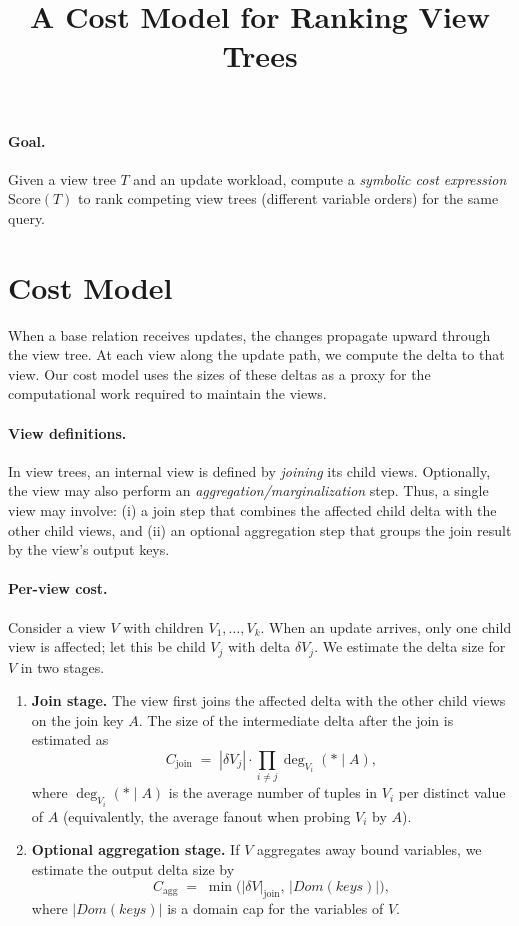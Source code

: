 \documentclass[11pt]{article}
\title{A Cost Model for Ranking View Trees}
\author{}
\date{}
\renewcommand{\deg}{\operatorname{deg}}
\begin{document}
\maketitle

\paragraph{Goal.}
Given a view tree $T$ and an update workload, compute a \emph{symbolic cost expression} $\mathrm{Score}(T)$ to rank competing view trees (different variable orders) for the same query.

\section{Cost Model}

When a base relation receives updates, the changes propagate upward through the view tree.
At each view along the update path, we compute the delta to that view.
Our cost model uses the sizes of these deltas as a proxy for the computational work required to maintain the views.

\paragraph{View definitions.}
In view trees, an internal view is defined by \emph{joining} its child views.
Optionally, the view may also perform an \emph{aggregation/marginalization} step.
Thus, a single view may involve:
(i) a join step that combines the affected child delta with the other child views, and
(ii) an optional aggregation step that groups the join result by the view's output keys.

\paragraph{Per-view cost.}
Consider a view $V$ with children $V_1,\ldots,V_k$.
When an update arrives, only one child view is affected; let this be child $V_j$ with delta $\delta V_j$.
We estimate the delta size for $V$ in two stages.

\begin{enumerate}
  \item \textbf{Join stage.}
  The view first joins the affected delta with the other child views on the join key $A$.
  The size of the intermediate delta after the join is estimated as
  \[
  C_{\mathrm{join}}
  \;=\;
  |\delta V_j|\cdot \prod_{i\neq j}\deg_{V_i}(*\mid A),
  \]
  where $\deg_{V_i}(*\mid A)$ is the average number of tuples in $V_i$ per distinct value of $A$
  (equivalently, the average fanout when probing $V_i$ by $A$).

  \item \textbf{Optional aggregation stage.}
  If $V$ aggregates away bound variables, we estimate the output delta size by
  \[
  C_{\mathrm{agg}}
  \;=\;
  \min\bigl(|\delta V|_{\mathrm{join}},\, |Dom(keys)|\bigr),
  \]
  where $|Dom(keys)|$ is a domain cap for the variables of $V$.
\end{enumerate}
\end{document}
